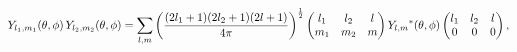 \[\mathop{Y_{{l_{1}},{m_{1}}}\/}\nolimits\!\left(\theta,\phi\right)\mathop{Y_{{l%
_{2}},{m_{2}}}\/}\nolimits\!\left(\theta,\phi\right)=\sum_{l,m}\left(\frac{(2l%
_{1}+1)(2l_{2}+1)(2l+1)}{4\pi}\right)^{\frac{1}{2}}\begin{pmatrix}l_{1}&l_{2}&%
l\\
m_{1}&m_{2}&m\end{pmatrix}{\mathop{Y_{{l},{m}}\/}\nolimits^{*}}\!\left(\theta,%
\phi\right)\begin{pmatrix}l_{1}&l_{2}&l\\
0&0&0\end{pmatrix},\]